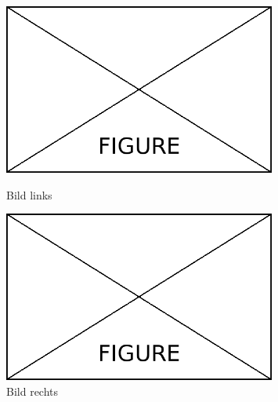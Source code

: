 \bigskip
\begin{figure}[H]
	\centering
	\begin{minipage}{0.5\textwidth}
		\centering
		\includegraphics[width=0.8\textwidth]{Content/Figures/figure.png}
		\caption{Bild links}
		\label{fig:testa}
	\end{minipage}%
	\begin{minipage}{0.5\textwidth}
		\centering
		\includegraphics[width=0.8\textwidth]{Content/Figures/figure.png}
		\caption{Bild rechts}
		\label{fig:testb}
	\end{minipage}
\end{figure}




